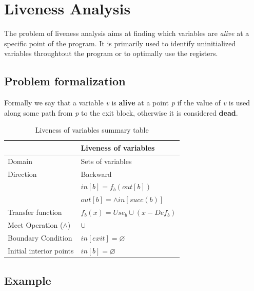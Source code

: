 \documentclass{article}
\begin{document}
\section{Liveness Analysis}

The problem of liveness analysis aims at finding which variables are \textit{alive} at a specific point of the program. It is primarily used to identify uninitialized variables throughtout the program or to optimally use the registers.

\subsection{Problem formalization}

Formally we say that a variable \textit{v} is \textbf{alive} at a point \textit{p} if the value of \textit{v} is used along some path from \textit{p} to the exit block, otherwise it is considered \textbf{dead}.

\begin{table}[H]
\centering
\begin{tabular}{|p{}|p{}|}
\hline
 & \textbf{Liveness of variables} \\
\hline
Domain & Sets of variables \\
\hline
Direction & Backward \\
 & $in[b] = f_b(out[b]) $ \\
 & $out[b] = \wedge in[succ(b)]$ \\
\hline
Transfer function & $f_b(x) = Use_b \cup (x - Def_b)$ \\
\hline
Meet Operation ($\wedge$) & $\cup$ \\
\hline
Boundary Condition & $in[exit] = \varnothing$ \\
\hline
Initial interior points & $in[b] = \varnothing$ \\
\hline
\end{tabular}
\caption{Liveness of variables summary table}
\label{tab:liveness}
\end{table}

\subsection{Example}
\end{document}
